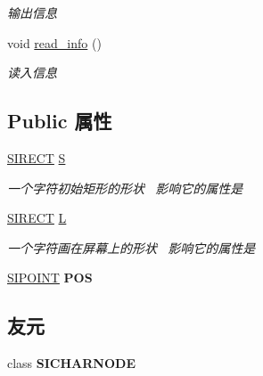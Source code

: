 \begin{DoxyCompactItemize}
\begin{DoxyCompactList}\small\item\em 输出信息 \end{DoxyCompactList}\item 
\mbox{\label{class_s_i_d_r_a_w___i_n_f_o_a2d8db77df4b1e4f142b64753f55738ba}} 
void \hyperlink{class_s_i_d_r_a_w___i_n_f_o_a2d8db77df4b1e4f142b64753f55738ba}{read\+\_\+info} ()
\begin{DoxyCompactList}\small\item\em 读入信息 \end{DoxyCompactList}\end{DoxyCompactItemize}
\subsection*{Public 属性}
\begin{DoxyCompactItemize}
\item 
\hyperlink{struct_s_i_r_e_c_t}{S\+I\+R\+E\+CT} \hyperlink{class_s_i_d_r_a_w___i_n_f_o_a495fac5bcc54e4b58d500a7117fde9d9}{S}
\begin{DoxyCompactList}\small\item\em 一个字符初始矩形的形状~\newline
影响它的属性是~\newline
\end{DoxyCompactList}\item 
\hyperlink{struct_s_i_r_e_c_t}{S\+I\+R\+E\+CT} \hyperlink{class_s_i_d_r_a_w___i_n_f_o_a41065961d296d245790773771670aae2}{L}
\begin{DoxyCompactList}\small\item\em 一个字符画在屏幕上的形状~\newline
影响它的属性是~\newline
\end{DoxyCompactList}\item 
\mbox{\label{class_s_i_d_r_a_w___i_n_f_o_ac2c7884804dc5749fb45d859ad63b10c}} 
\hyperlink{struct_s_i_p_o_i_n_t}{S\+I\+P\+O\+I\+NT} {\bfseries P\+OS}
\end{DoxyCompactItemize}
\subsection*{友元}
\begin{DoxyCompactItemize}
\item 
\mbox{\label{class_s_i_d_r_a_w___i_n_f_o_a33fe671aa658d4d9c3e3723f54dd2f31}} 
class {\bfseries S\+I\+C\+H\+A\+R\+N\+O\+DE}
\end{DoxyCompactItemize}


